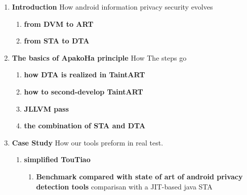 \documentclass[
    ngerman,american
    ]{scrartcl}
\newcommand{\lang}{en}
\begin{document}
        \sectionInitialTOC{\lang}
        \sectionInitialTOCDescription{\lang}
        
        \begin{enumerate}
            \item \textbf{Introduction} How android information privacy security evolves
                    \begin{enumerate}
                        \item \textbf{from DVM to ART} 
                        \item \textbf{from STA to DTA} 
                    \end{enumerate}
            \item \textbf{The basics of ApakoHa principle} How The steps go
                    \begin{enumerate}
                        \item \textbf{how DTA is realized in TaintART} 
                        \item \textbf{how to second-develop TaintART}
                        \item \textbf{JLLVM pass}
                        \item \textbf{the combination of STA and DTA} 
                    \end{enumerate}
            \item \textbf{Case Study} How our tools preform in real test.
                    \begin{enumerate}
                        \item \textbf{simplified TouTiao}
                        \begin{enumerate}
                            \item \textbf{Benchmark compared with state of art of android privacy detection tools} comparisan with a JIT-based java STA

\end{enumerate}
\end{enumerate}
\end{enumerate}
\end{document}
